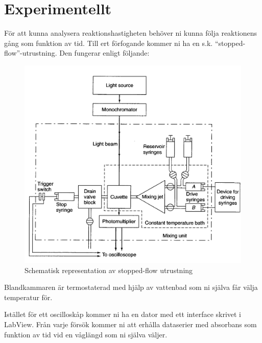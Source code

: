 \section{Experimentellt}
\label{sec:exper}
För att kunna analysera reaktionshastigheten behöver ni kunna följa
reaktionens gång som funktion av tid. Till ert förfogande kommer ni ha en
s.k. ``stopped-flow''-utrustning. Den fungerar enligt följande:

\begin{figure}[center]
  \centering
  \includegraphics[scale=0.2]{fig/stopped_flow.png}
  \caption{Schematisk representation av stopped-flow utrustning}
  \label{fig:stopped-flow}
\end{figure}

Blandkammaren är termostaterad med hjälp av vattenbad som ni själva får
välja temperatur för. 

Istället för ett oscilloskåp kommer ni ha en dator med ett interface
skrivet i LabView. Från varje försök kommer ni att erhålla dataserier med
absorbans som funktion av tid vid en våglängd som ni själva väljer.


